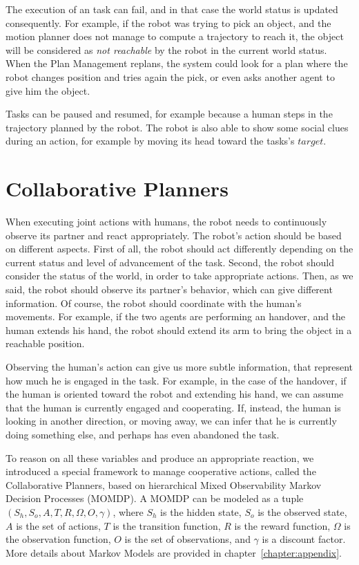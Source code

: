 The execution of an task can fail, and in that case the world status is updated consequently. For example, if the robot was trying to pick an object, and the motion planner does not manage to compute a trajectory to reach it, the object will be considered as \textit{not reachable} by the robot in the current world status. When the Plan Management replans, the system could look for a plan where the robot changes position and tries again the pick, or even asks another agent to give him the object.

Tasks can be paused and resumed, for example because a human steps in the trajectory planned by the robot. The robot is also able to show some social clues during an action, for example by moving its head toward the tasks's $target$. 

\section{Collaborative Planners} 
\label{sec:task_execution-collaborative_planners}
When executing joint actions with humans, the robot needs to continuously observe its partner and react appropriately. The robot's action should be based on different aspects. First of all, the robot should act differently depending on the current status and level of advancement of the task. Second, the robot should consider the status of the world, in order to take appropriate actions. Then, as we said, the robot should observe its partner's behavior, which can give different information. Of course, the robot should coordinate with the human's movements. For example, if the two agents are performing an handover, and the human extends his hand, the robot should extend its arm to bring the object in a reachable position.

Observing the human's action can give us more subtle information, that represent how much he is engaged in the task. For example, in the case of the handover, if the human is oriented toward the robot and extending his hand, we can assume that the human is currently engaged and cooperating. If, instead, the human is looking in another direction, or moving away, we can infer that he is currently doing something else, and perhaps has even abandoned the task.

To reason on all these variables and produce an appropriate reaction, we introduced a special framework to manage cooperative actions, called the Collaborative Planners, based on hierarchical Mixed Observability Markov Decision Processes (MOMDP). A MOMDP can be modeled as a tuple $(S_h,S_o,A,T,R,\Omega,O,\gamma)$, where $S_h$ is the hidden state, $S_o$ is the observed state, $A$ is the set of actions, $T$ is the transition function, $R$ is the reward function, $\Omega$ is the observation function, $O$ is the set of observations, and $\gamma$ is a discount factor. More details about Markov Models are provided in chapter~\ref{chapter:appendix}.

